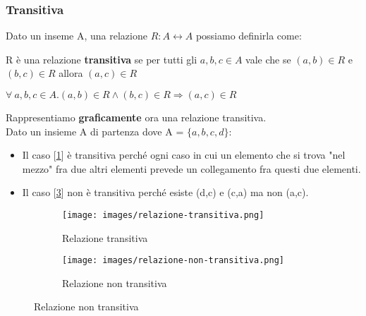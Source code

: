 \subsubsection{Transitiva}
Dato un inseme A, una relazione $R: A \longleftrightarrow A$ possiamo definirla come:
\begin{definition}[Transitiva]
    R è una relazione \textbf{transitiva} se per tutti gli $a,b,c \in A$ vale che se $(a, b) \in R$ e $(b, c) \in R$ allora $(a, c) \in R$
    \begin{center}
        $\forall \: a,b,c \in A . (a, b) \in R \land (b, c) \in R \Longrightarrow (a,c) \in R$
    \end{center}
\end{definition}
Rappresentiamo \textbf{graficamente} ora una relazione transitiva. \\Dato un insieme A di partenza dove A = $\{a, b, c, d\}$:
\begin{itemize}
    \item Il caso [\ref{fig:relazione-transitiva}] è transitiva perché ogni caso in cui un elemento che si trova "nel mezzo" fra due altri elementi prevede un collegamento fra questi due elementi.
    \item Il caso [\ref{fig:relazione-non-transitiva}] non è transitiva perché esiste (d,c) e (c,a) ma non (a,c).
\end{itemize}
\begin{figure}[h!]
    \vspace{-10pt}
    \centering
    \begin{subfigure}{.3\textwidth}
        \centering
        \texttt{[image: images/relazione-transitiva.png]}
        \caption{Relazione transitiva}
        \label{fig:relazione-transitiva}
    \end{subfigure}
    \hspace{1.5cm}
    \begin{subfigure}{.3\textwidth}
        \centering
        \texttt{[image: images/relazione-non-transitiva.png]}
        \caption{Relazione non transitiva}
        \label{fig:relazione-non-transitiva}
    \end{subfigure}
\end{figure}
\newpage

